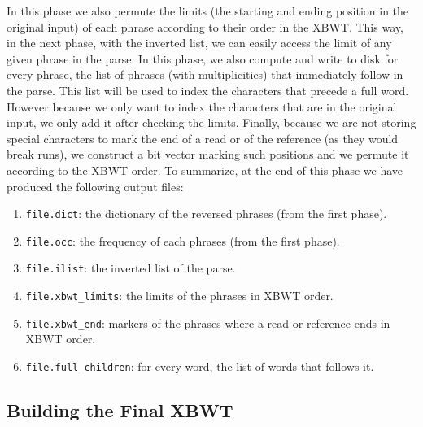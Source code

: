 In this phase we also permute the limits (the starting and ending position in the original input) of each phrase according to their order in the XBWT. This way, in the next phase, with the inverted list, we can easily access the limit of any given phrase in the parse. In this phase, we also compute and write to disk for every phrase, the list of phrases (with multiplicities) that immediately follow in the parse. This list will be used to index the characters that precede a full word. However because we only want to index the characters that are in the original input, we only add it after checking the limits. Finally, because we are not storing special characters to mark the end of a read or of the reference (as they would break runs), we construct a bit vector marking such positions and we permute it according to the XBWT order. To summarize, at the end of this phase we have produced the following output files:
\begin{enumerate}
    \item \texttt{file.dict}: the dictionary of the reversed phrases (from the first phase).
    \item \texttt{file.occ}: the frequency of each phrases (from the first phase).
    \item \texttt{file.ilist}: the inverted list of the parse.
    \item \texttt{file.xbwt\_limits}: the limits of the phrases in XBWT order.
    \item \texttt{file.xbwt\_end}: markers of the phrases where a read or reference ends in XBWT order.
    \item \texttt{file.full\_children}: for every word, the list of words that follows it.
\end{enumerate}


\subsection{Building the Final XBWT}

